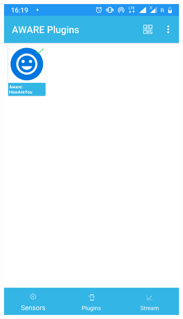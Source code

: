 \begin{enumerate}
	\begin{figure}[H]
		\centering
		\begin{subfigure}{0.35\textwidth}
			\centering
			\includegraphics[scale=0.13]{dodatekA/3_3.png}
			\subcaption{\label{subfigure_a}}
		\end{subfigure}
		\begin{subfigure}{0.35\textwidth}
			\centering

\end{subfigure}
\end{figure}
\end{enumerate}
